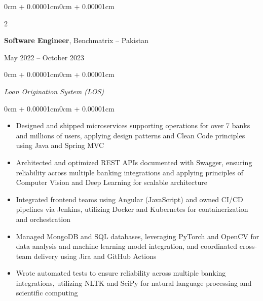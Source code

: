 \documentclass[10pt, letterpaper]{article}
\newenvironment{highlights}{
    \begin{itemize}[
        topsep=0.10cm,
        parsep=0.10cm,
        partopsep=0pt,
        itemsep=0pt,
        leftmargin=0cm + 10pt
    ]
}{
    \end{itemize}
}
\newenvironment{onecolentry}{
    \begin{adjustwidth}{0cm + 0.00001cm}{0cm + 0.00001cm}
}{
    \end{adjustwidth}
}
\newenvironment{twocolentry}[2][]{
    \onecolentry
    \def\secondColumn{#2}
    \setcolumnwidth{\fill, 5cm}
    \begin{paracol}{2}
}{
    \switchcolumn \raggedleft \secondColumn
    \end{paracol}
    \endonecolentry
}
\begin{document}
\begin{twocolentry}{May 2022 – October 2023}
    \textbf{Software Engineer}, Benchmatrix -- Pakistan
\end{twocolentry}
\vspace{0.10cm}
\begin{onecolentry}
\textit{Loan Origination System (LOS)}
\end{onecolentry}
\vspace{0.05cm}
\begin{onecolentry}
\begin{highlights}
    \item Designed and shipped microservices supporting operations for over 7 banks and millions of users, applying design patterns and Clean Code principles using Java and Spring MVC
    \item Architected and optimized REST APIs documented with Swagger, ensuring reliability across multiple banking integrations and applying principles of Computer Vision and Deep Learning for scalable architecture
    \item Integrated frontend teams using Angular (JavaScript) and owned CI/CD pipelines via Jenkins, utilizing Docker and Kubernetes for containerization and orchestration
    \item Managed MongoDB and SQL databases, leveraging PyTorch and OpenCV for data analysis and machine learning model integration, and coordinated cross-team delivery using Jira and GitHub Actions
    \item Wrote automated tests to ensure reliability across multiple banking integrations, utilizing NLTK and SciPy for natural language processing and scientific computing
\end{highlights}
\end{onecolentry}

\vspace{0.3cm}
\end{document}
